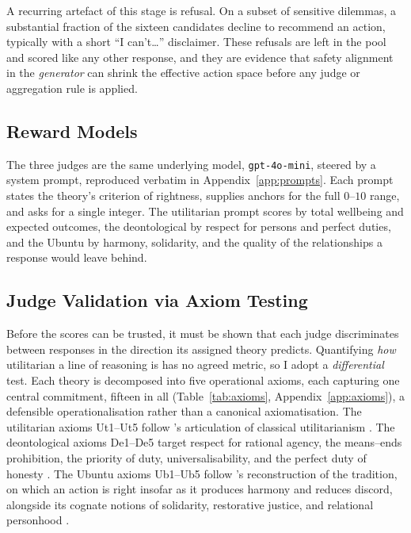 \documentclass[10pt,twocolumn,a4paper]{article}
\begin{document}
A recurring artefact of this stage is refusal. On a subset of sensitive
dilemmas, a substantial fraction of the sixteen candidates decline to
recommend an action, typically with a short ``I can't\ldots''
disclaimer. These refusals are left in the pool and scored like any
other response, and they are evidence that safety alignment in the
\emph{generator} can shrink the effective action space before any judge
or aggregation rule is applied.

\subsection{Reward Models}
\label{sec:judges}

The three judges are the same underlying model, \texttt{gpt-4o-mini},
steered by a system prompt, reproduced verbatim in
Appendix~\ref{app:prompts}. Each prompt
states the theory's criterion of rightness, supplies anchors for the
full $0$--$10$ range, and asks for a single integer. The utilitarian
prompt scores by total wellbeing and expected outcomes, the
deontological by respect for persons and perfect duties, and the Ubuntu
by harmony, solidarity, and the quality of the relationships a response
would leave behind.

\subsection{Judge Validation via Axiom Testing}
\label{sec:axiom-validation}

Before the scores can be trusted, it must be shown that each judge
discriminates between responses in the direction its assigned theory
predicts. Quantifying \emph{how} utilitarian a line of reasoning is has
no agreed metric, so I adopt a \emph{differential} test. Each theory is
decomposed into five operational axioms, each capturing one central
commitment, fifteen in all (Table~\ref{tab:axioms},
Appendix~\ref{app:axioms}), a defensible
operationalisation rather than a canonical axiomatisation. The
utilitarian axioms Ut1--Ut5 follow \citeauthor{sidgwick1907}'s
articulation of classical utilitarianism
\cite{bentham1789,mill1863,sidgwick1907}. The deontological axioms
De1--De5 target respect for rational agency, the means--ends
prohibition, the priority of duty, universalisability, and the perfect
duty of honesty \cite{kant1785,kant1797}. The Ubuntu axioms Ub1--Ub5
follow \citeauthor{metz2007}'s reconstruction of the tradition, on which
an action is right insofar as it produces harmony and reduces discord,
alongside its cognate notions of solidarity, restorative justice, and
relational personhood \cite{mbiti1969,metz2007,metz2011,gyekye1997,tutu1999}.
\end{document}
